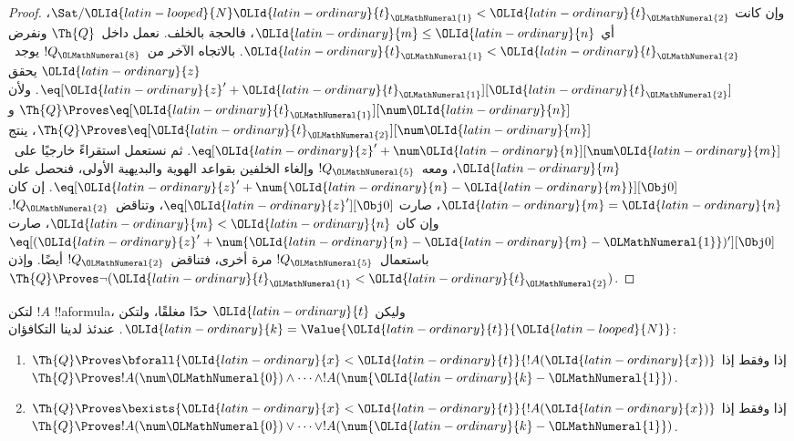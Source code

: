 \documentclass[../../../include/open-logic-section]{subfiles}
\begin{document}
\begin{proof}
وإن كانت $\Sat/{\OLId{latin-looped}{N}}{\OLId{latin-ordinary}{t}_\OLMathNumeral{1}<\OLId{latin-ordinary}{t}_\OLMathNumeral{2}}$، أي $\OLId{latin-ordinary}{m}\leq \OLId{latin-ordinary}{n}$، فالحجة بالخلف.
%
نعمل داخل~$\Th{Q}$ ونفرض $\OLId{latin-ordinary}{t}_\OLMathNumeral{1}<\OLId{latin-ordinary}{t}_\OLMathNumeral{2}$.
بالاتجاه الآخر من~$!Q_\OLMathNumeral{8}$ يوجد~$\OLId{latin-ordinary}{z}$ يحقق $\eq[\OLId{latin-ordinary}{z}'+\OLId{latin-ordinary}{t}_\OLMathNumeral{1}][\OLId{latin-ordinary}{t}_\OLMathNumeral{2}]$.
ولأن $\Th{Q}\Proves\eq[\OLId{latin-ordinary}{t}_\OLMathNumeral{1}][\num \OLId{latin-ordinary}{n}]$
و$\Th{Q}\Proves\eq[\OLId{latin-ordinary}{t}_\OLMathNumeral{2}][\num \OLId{latin-ordinary}{m}]$، ينتج
$\eq[\OLId{latin-ordinary}{z}'+\num \OLId{latin-ordinary}{n}][\num \OLId{latin-ordinary}{m}]$.
%
ثم نستعمل استقراءً خارجيًا على~$\OLId{latin-ordinary}{m}$، ومعه~$!Q_\OLMathNumeral{5}$ وإلغاء الخلفين بقواعد
الهوية والبديهية الأولى، فنحصل على
$\eq[\OLId{latin-ordinary}{z}'+\num{\OLId{latin-ordinary}{n}-\OLId{latin-ordinary}{m}}][\Obj 0]$.
إن كان $\OLId{latin-ordinary}{m}=\OLId{latin-ordinary}{n}$، صارت $\eq[\OLId{latin-ordinary}{z}'][\Obj 0]$، وتناقض~$!Q_\OLMathNumeral{2}$.
وإن كان $\OLId{latin-ordinary}{m}<\OLId{latin-ordinary}{n}$، صارت
$\eq[(\OLId{latin-ordinary}{z}'+\num{\OLId{latin-ordinary}{n}-\OLId{latin-ordinary}{m}-\OLMathNumeral{1}})'][\Obj 0]$ باستعمال~$!Q_\OLMathNumeral{5}$ مرة أخرى،
فتناقض~$!Q_\OLMathNumeral{2}$ أيضًا. وإذن $\Th{Q}\Proves\lnot(\OLId{latin-ordinary}{t}_\OLMathNumeral{1}<\OLId{latin-ordinary}{t}_\OLMathNumeral{2})$.
\end{proof}

\begin{lem}
لتكن $!A$ !!a{formula}، وليكن $\OLId{latin-ordinary}{t}$ حدًا مغلقًا،
ولتكن $\OLId{latin-ordinary}{k}=\Value{\OLId{latin-ordinary}{t}}{\OLId{latin-looped}{N}}$. عندئذ لدينا التكافؤان:
\begin{enumerate}
\item $\Th{Q}\Proves\bforall{\OLId{latin-ordinary}{x}<\OLId{latin-ordinary}{t}}{!A(\OLId{latin-ordinary}{x})}$ إذا وفقط إذا
    $\Th{Q}\Proves !A(\num \OLMathNumeral{0})\land\dots\land !A(\num{\OLId{latin-ordinary}{k}-\OLMathNumeral{1}})$.
\item $\Th{Q}\Proves\bexists{\OLId{latin-ordinary}{x}<\OLId{latin-ordinary}{t}}{!A(\OLId{latin-ordinary}{x})}$ إذا وفقط إذا
    $\Th{Q}\Proves !A(\num \OLMathNumeral{0})\lor\dots\lor !A(\num{\OLId{latin-ordinary}{k}-\OLMathNumeral{1}})$.
\end{enumerate}
\end{lem}
\end{document}
